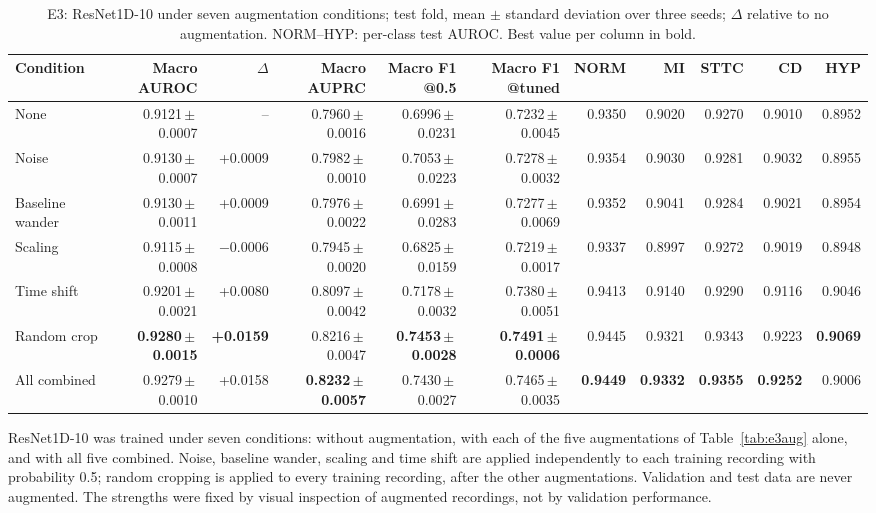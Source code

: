 \documentclass{article}
\begin{document}
\begin{table}[htb]
  \caption{E3: ResNet1D-10 under seven augmentation conditions; test fold, mean $\pm$ standard deviation over three seeds; $\Delta$ relative to no augmentation. NORM--HYP: per-class test AUROC. Best value per column in bold.}
  \label{tab:e3}
  \centering\footnotesize
  \begin{adjustbox}{max width=\linewidth}
  \begin{tabular}{lrrrrrrrrrr}
    \toprule
    Condition & Macro AUROC & $\Delta$ & Macro AUPRC & Macro F1 @0.5 & Macro F1 @tuned & NORM & MI & STTC & CD & HYP \\
    \midrule
    None & 0.9121\,$\pm$\,0.0007 & -- & 0.7960\,$\pm$\,0.0016 & 0.6996\,$\pm$\,0.0231 & 0.7232\,$\pm$\,0.0045 & 0.9350 & 0.9020 & 0.9270 & 0.9010 & 0.8952 \\
    Noise & 0.9130\,$\pm$\,0.0007 & +0.0009 & 0.7982\,$\pm$\,0.0010 & 0.7053\,$\pm$\,0.0223 & 0.7278\,$\pm$\,0.0032 & 0.9354 & 0.9030 & 0.9281 & 0.9032 & 0.8955 \\
    Baseline wander & 0.9130\,$\pm$\,0.0011 & +0.0009 & 0.7976\,$\pm$\,0.0022 & 0.6991\,$\pm$\,0.0283 & 0.7277\,$\pm$\,0.0069 & 0.9352 & 0.9041 & 0.9284 & 0.9021 & 0.8954 \\
    Scaling & 0.9115\,$\pm$\,0.0008 & $-$0.0006 & 0.7945\,$\pm$\,0.0020 & 0.6825\,$\pm$\,0.0159 & 0.7219\,$\pm$\,0.0017 & 0.9337 & 0.8997 & 0.9272 & 0.9019 & 0.8948 \\
    Time shift & 0.9201\,$\pm$\,0.0021 & +0.0080 & 0.8097\,$\pm$\,0.0042 & 0.7178\,$\pm$\,0.0032 & 0.7380\,$\pm$\,0.0051 & 0.9413 & 0.9140 & 0.9290 & 0.9116 & 0.9046 \\
    Random crop & \textbf{0.9280\,$\pm$\,0.0015} & \textbf{+0.0159} & 0.8216\,$\pm$\,0.0047 & \textbf{0.7453\,$\pm$\,0.0028} & \textbf{0.7491\,$\pm$\,0.0006} & 0.9445 & 0.9321 & 0.9343 & 0.9223 & \textbf{0.9069} \\
    All combined & 0.9279\,$\pm$\,0.0010 & +0.0158 & \textbf{0.8232\,$\pm$\,0.0057} & 0.7430\,$\pm$\,0.0027 & 0.7465\,$\pm$\,0.0035 & \textbf{0.9449} & \textbf{0.9332} & \textbf{0.9355} & \textbf{0.9252} & 0.9006 \\
    \bottomrule
  \end{tabular}
  \end{adjustbox}
\end{table}


ResNet1D-10 was trained under seven conditions: without augmentation, with each of the five augmentations of Table~\ref{tab:e3aug} alone, and with all five combined. Noise, baseline wander, scaling and time shift are applied independently to each training recording with probability 0.5; random cropping is applied to every training recording, after the other augmentations. Validation and test data are never augmented. The strengths were fixed by visual inspection of augmented recordings, not by validation performance.
\end{document}
